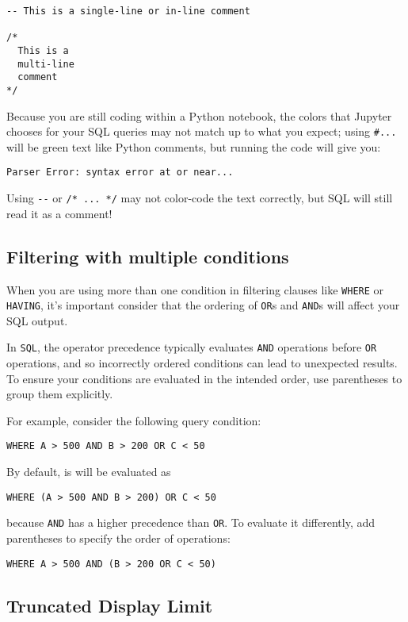 \documentclass[
  letterpaper,
  DIV=11,
  numbers=noendperiod]{scrreprt}
\begin{document}
\begin{verbatim}
-- This is a single-line or in-line comment

/* 
  This is a 
  multi-line 
  comment 
*/
\end{verbatim}

Because you are still coding within a Python notebook, the colors that
Jupyter chooses for your SQL queries may not match up to what you
expect; using \texttt{\#...} will be green text like Python comments,
but running the code will give you:

\texttt{Parser\ Error:\ syntax\ error\ at\ or\ near...}

Using \texttt{-\/-} or \texttt{/*\ ...\ */} may not color-code the text
correctly, but SQL will still read it as a comment!

\subsection{Filtering with multiple
conditions}\label{filtering-with-multiple-conditions}

When you are using more than one condition in filtering clauses like
\texttt{WHERE} or \texttt{HAVING}, it's important consider that the
ordering of \texttt{OR}s and \texttt{AND}s will affect your SQL output.

In \texttt{SQL}, the operator precedence typically evaluates
\texttt{AND} operations before \texttt{OR} operations, and so
incorrectly ordered conditions can lead to unexpected results. To ensure
your conditions are evaluated in the intended order, use parentheses to
group them explicitly.

For example, consider the following query condition:

\texttt{WHERE\ A\ \textgreater{}\ 500\ AND\ B\ \textgreater{}\ 200\ OR\ C\ \textless{}\ 50}

By default, is will be evaluated as

\texttt{WHERE\ (A\ \textgreater{}\ 500\ AND\ B\ \textgreater{}\ 200)\ OR\ C\ \textless{}\ 50}

because \texttt{AND} has a higher precedence than \texttt{OR}. To
evaluate it differently, add parentheses to specify the order of
operations:

\texttt{WHERE\ A\ \textgreater{}\ 500\ AND\ (B\ \textgreater{}\ 200\ OR\ C\ \textless{}\ 50)}

\subsection{Truncated Display Limit}\label{truncated-display-limit}
\end{document}
